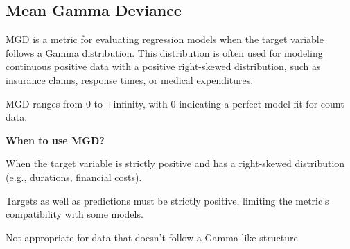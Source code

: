 \subsection{Mean Gamma Deviance}

MGD is a metric for evaluating regression models when the target variable follows a Gamma distribution. This distribution is often used for modeling continuous positive data with a
positive right-skewed distribution, such as insurance claims, response times, or medical expenditures.

\begin{center}
\end{center}

MGD ranges from 0 to +infinity, with 0 indicating a perfect model fit for count data.

\textbf{When to use MGD?}

When the target variable is strictly positive and has a right-skewed distribution (e.g., durations, financial costs).

{
    \item Targets as well as predictions must be strictly positive, limiting the metric’s compatibility with some models.
    \item Not appropriate for data that doesn't follow a Gamma-like structure
}

\clearpage
